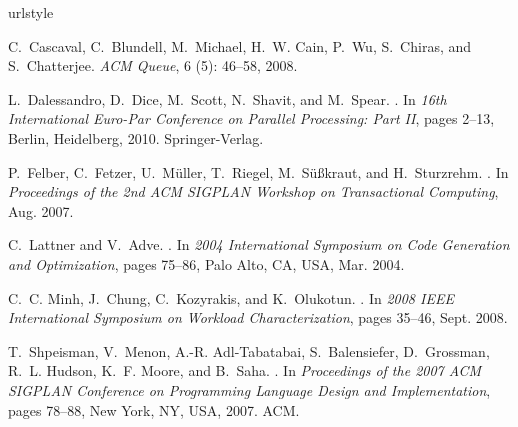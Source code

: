\documentclass[preprint]{sigplanconf}
\begin{document}
\begin{thebibliography}{10}
        \softraggedright
        \providecommand{\natexlab}[1]{#1}
        \providecommand{\url}[1]{\texttt{#1}}
        \expandafter\ifx\csname urlstyle\endcsname\relax
        \providecommand{\doi}[1]{doi: #1}\else
        \providecommand{\doi}{doi: \begingroup \urlstyle{rm}\Url}\fi

        C.~Cascaval, C.~Blundell, M.~Michael, H.~W. Cain, P.~Wu, S.~Chiras, and
        S.~Chatterjee.
        \newblock \emph{ACM Queue}, 6 (5): 46--58, 2008.

        L.~Dalessandro, D.~Dice, M.~Scott, N.~Shavit, and M.~Spear.
        .
        \newblock In \emph{16th International Euro-Par Conference on Parallel
        Processing: Part II}, pages 2--13, Berlin, Heidelberg, 2010. Springer-Verlag.

        P.~Felber, C.~Fetzer, U.~M{\"u}ller, T.~Riegel, M.~S{\"u}{\ss}kraut, and
        H.~Sturzrehm.
        .
        \newblock In \emph{Proceedings of the 2nd ACM SIGPLAN Workshop on Transactional
        Computing}, Aug. 2007.

        C.~Lattner and V.~Adve.
        .
    \newblock In \emph{2004 International Symposium on Code Generation and
    Optimization}, pages 75--86, Palo Alto, CA, USA, Mar. 2004.

    C.~C. Minh, J.~Chung, C.~Kozyrakis, and K.~Olukotun.
    .
    \newblock In \emph{2008 IEEE International Symposium on Workload
    Characterization}, pages 35--46, Sept. 2008.

    T.~Shpeisman, V.~Menon, A.-R. Adl-Tabatabai, S.~Balensiefer, D.~Grossman, R.~L.
    Hudson, K.~F. Moore, and B.~Saha.
    .
    \newblock In \emph{Proceedings of the 2007 ACM SIGPLAN Conference on
    Programming Language Design and Implementation}, pages 78--88, New York, NY,
    USA, 2007. ACM.


\end{thebibliography}
\end{document}
